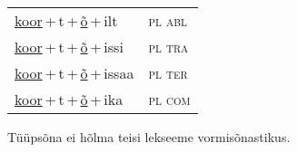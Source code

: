 \begin{minipage}{\textwidth}
\begin{sideways}
\begin{tabular}{l l}
\underline{koor}\,+\,t\,+\,\underline{õ}\,+\,ilt & \textsc{ pl abl } \\
\underline{koor}\,+\,t\,+\,\underline{õ}\,+\,issi & \textsc{ pl tra } \\
\underline{koor}\,+\,t\,+\,\underline{õ}\,+\,issaa & \textsc{ pl ter } \\
\underline{koor}\,+\,t\,+\,\underline{õ}\,+\,ika & \textsc{ pl com } \\
\end{tabular}
\end{sideways}
\label{tab:tüüpsõnamall-koorrõ}

\end{minipage}

 
\vspace{1em}
\noindent Tüüpsõna ei hõlma teisi lekseeme vormi\-sõnastikus.
